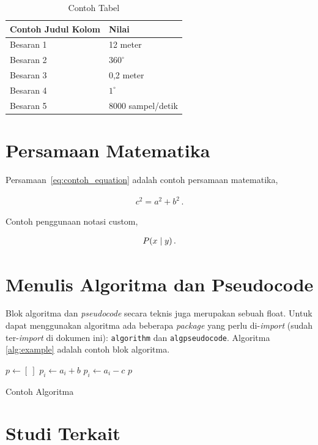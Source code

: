 \documentclass[../index.tex]{subfiles}
\begin{document}
\begin{table}[htbp]
	\centering
	\caption{Contoh Tabel}
	\label{table:contoh_tabel}
	\begin{tabular}{ll}
		\toprule
		\multicolumn{1}{l}{\textbf{Contoh Judul Kolom}} & \multicolumn{1}{l}{\textbf{Nilai}} \\
		\midrule
		Besaran 1                                       & 12 meter                           \\
		Besaran 2                                       & $360^\circ$                        \\
		Besaran 3                                       & 0,2 meter                          \\
		Besaran 4                                       & $1^\circ$                          \\
		Besaran 5                                       & 8000 sampel/detik                  \\
		\bottomrule
	\end{tabular}
\end{table}

\section{Persamaan Matematika}

Persamaan~\eqref{eq:contoh_equation} adalah contoh persamaan matematika,

\begin{align}
	c^2 = a^2 + b^2\,.
	\label{eq:contoh_equation}
\end{align}

Contoh penggunaan notasi custom,

\begin{align}
	P(x \mid y)\,.
	\label{eq:contoh_equation_custom}
\end{align}

\section{Menulis Algoritma dan Pseudocode}

Blok algoritma dan \textit{pseudocode} secara teknis juga merupakan sebuah float. Untuk dapat menggunakan algoritma ada beberapa \textit{package} yang perlu di-\textit{import} (sudah ter-\textit{import} di dokumen ini): \texttt{algorithm} dan \texttt{algpseudocode}. Algoritma \ref{alg:example} adalah contoh blok algoritma.

\begin{algorithm}
	\begin{algorithmic}[1]
		\State $p \gets [~]$
		\State $p_i \gets a_i + b$
		\Else
		\State $p_i \gets a_i - c$
		\EndIf
		\EndFor
		\State \Return $p$
		\EndFunction
	\end{algorithmic}
	\caption{Contoh Algoritma}
	\label{alg:example}
\end{algorithm}

\section{Studi Terkait}
\blindtext
\end{document}

